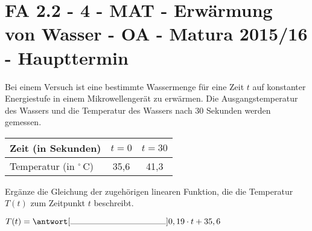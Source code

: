 \section{FA 2.2 - 4 - MAT - Erwärmung von Wasser - OA - Matura 2015/16 - Haupttermin}

\begin{beispiel}[FA 2.2]{1} %
Bei einem Versuch ist eine bestimmte Wassermenge für eine Zeit $t$ auf konstanter Energiestufe in einem Mikrowellengerät zu erwärmen. Die Ausgangstemperatur des Wassers und die Temperatur
des Wassers nach 30 Sekunden werden gemessen.

\begin{center}
\begin{tabular}{|l|c|c|} \hline
\cellcolor{gray!30}Zeit (in Sekunden) & $t=0$ & $t=30$ \\ \hline
\cellcolor{gray!30}Temperatur (in $^\circ$\,C) & 35,6 & 41,3 \\ \hline
\end{tabular}
\end{center} \leer

Ergänze die Gleichung der zugehörigen linearen Funktion, die die Temperatur $T(t)$ zum Zeitpunkt
$t$ beschreibt. \leer

$T(t) = \antwort[\rule{4cm}{0.3pt}]{0,19} \cdot t + 35,6$
\end{beispiel}